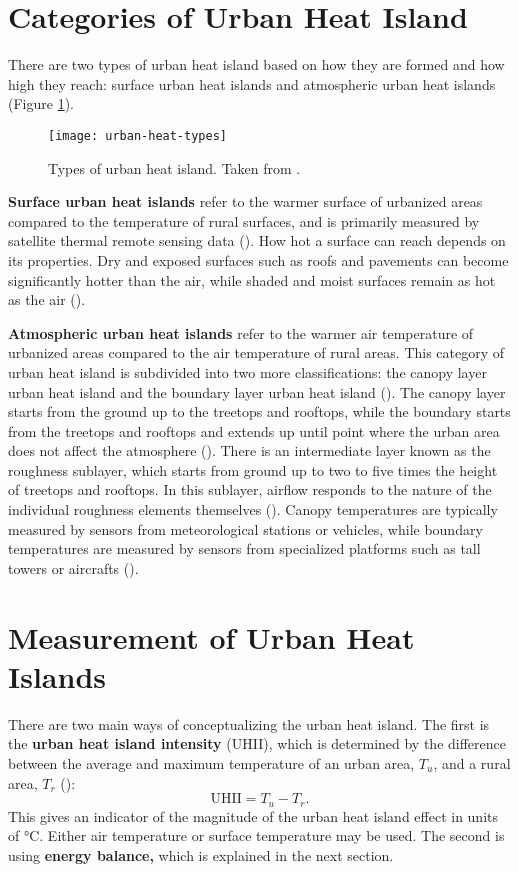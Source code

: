\section{Categories of Urban Heat Island}
	
	There are two types of urban heat island based on how they are formed and how high they reach:
	surface urban heat islands and atmospheric urban heat islands (Figure \ref{fig:urban-heat-types}).
	
	\begin{figure}
		\centering
		\texttt{[image: urban-heat-types]}
		\caption{Types of urban heat island. Taken from \textcite{Khan2021}.}
		\label{fig:urban-heat-types}
	\end{figure}
	
	\textbf{Surface urban heat islands} refer to the warmer surface of urbanized areas compared to the temperature of rural surfaces, and is primarily measured by satellite thermal remote sensing data (\cite{Zhou2018}). 
	How hot a surface can reach depends on its properties.
	Dry and exposed surfaces such as roofs and pavements can become significantly hotter than the air, while shaded and moist surfaces remain as hot as the air (\cite{Khan2021}). 
	
	\textbf{Atmospheric urban heat islands} refer to the warmer air temperature of urbanized areas compared to the air temperature of rural areas.
	This category of urban heat island is subdivided into two more classifications:
	the canopy layer urban heat island and the boundary layer urban heat island (\cite{Zhou2018}).
	The canopy layer starts from the ground up to the treetops and rooftops, 
	while the boundary starts from the treetops and rooftops and extends up until point where the urban area does not affect the atmosphere (\cite{Khan2021}).
	There is an intermediate layer known as the roughness sublayer, which starts from ground up to two to five times the height of
	treetops and rooftops.
	In this sublayer, airflow responds to the nature of the individual
	roughness elements themselves (\cite{Oke2017urban}).
	Canopy temperatures are typically measured by sensors from meteorological stations or vehicles,
	while boundary temperatures are measured by sensors from specialized platforms such as tall towers or aircrafts (\cite{Zhou2018}).

\section{Measurement of Urban Heat Islands}
	There are two main ways of conceptualizing the urban heat island.
	The first is the \textbf{urban heat island intensity} (UHII),
	which is determined by the difference between the average and maximum temperature of an urban area, $T_u$, and a rural area, $T_r$ (\cite{Kim2021}):
	\begin{equation}
		\text{UHII} = T_u - T_r.
	\end{equation}
	This gives an indicator of the magnitude of the urban heat island effect in units of $\unit{\degreeCelsius}$.
	Either air temperature or surface temperature may be used.
	The second is using \textbf{energy balance,} which is explained in the next section.
	
